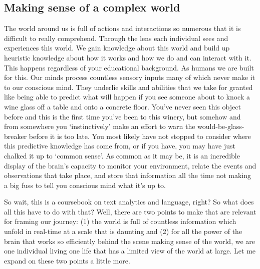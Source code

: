\documentclass[
]{article}
\begin{document}
\hypertarget{making-sense-of-a-complex-world}{%
\subsection{Making sense of a complex world}\label{making-sense-of-a-complex-world}}

The world around us is full of actions and interactions so numerous that it is difficult to really comprehend. Through the lens each individual sees and experiences this world. We gain knowledge about this world and build up heuristic knowledge about how it works and how we do and can interact with it. This happens regardless of your educational background. As humans we are built for this. Our minds process countless sensory inputs many of which never make it to our conscious mind. They underlie skills and abilities that we take for granted like being able to predict what will happen if you see someone about to knock a wine glass off a table and onto a concrete floor. You've never seen this object before and this is the first time you've been to this winery, but somehow and from somewhere you `instinctively' make an effort to warn the would-be-glass-breaker before it is too late. You most likely have not stopped to consider where this predictive knowledge has come from, or if you have, you may have just chalked it up to `common sense'. As common as it may be, it is an incredible display of the brain's capacity to monitor your environment, relate the events and observations that take place, and store that information all the time not making a big fuss to tell you conscious mind what it's up to.

So wait, this is a coursebook on text analytics and language, right? So what does all this have to do with that? Well, there are two points to make that are relevant for framing our journey: (1) the world is full of countless information which unfold in real-time at a scale that is daunting and (2) for all the power of the brain that works so efficiently behind the scene making sense of the world, we are one individual living one life that has a limited view of the world at large. Let me expand on these two points a little more.
\end{document}
